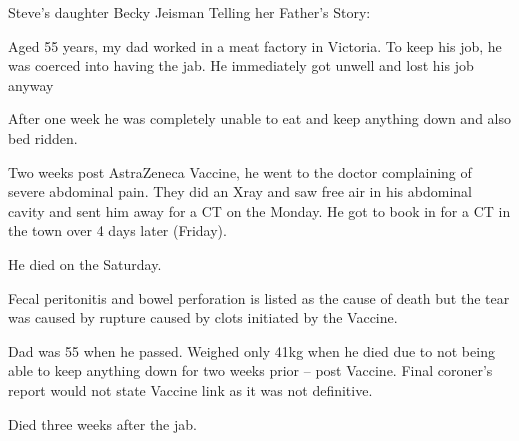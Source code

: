 Steve’s daughter Becky Jeisman Telling her Father’s Story:

Aged 55 years, my dad worked in a meat factory in Victoria. To keep his job, he
was coerced into having the jab. He immediately got unwell and lost his job
anyway

After one week he was completely unable to eat and keep anything down and also
bed ridden.

Two weeks post AstraZeneca Vaccine, he went to the doctor complaining of severe
abdominal pain. They did an Xray and saw free air in his abdominal cavity and
sent him away for a CT on the Monday. He got to book in for a CT in the town
over 4 days later (Friday).

He died on the Saturday.

Fecal peritonitis and bowel perforation is listed as the cause of death but the
tear was caused by rupture caused by clots initiated by the Vaccine.

Dad was 55 when he passed. Weighed only 41kg when he died due to not being able
to keep anything down for two weeks prior – post Vaccine.  Final coroner’s
report would not state Vaccine link as it was not definitive.

Died three weeks after the jab.

